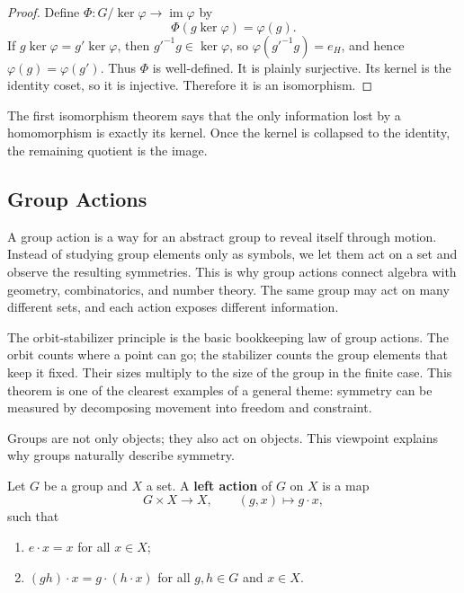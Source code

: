 \begin{proof}
Define $\Phi:G/\ker\varphi\to\operatorname{im}\varphi$ by
\[
    \Phi(g\ker\varphi)=\varphi(g).
\]
If $g\ker\varphi=g'\ker\varphi$, then $g'^{-1}g\in\ker\varphi$, so $\varphi(g'^{-1}g)=e_H$, and hence $\varphi(g)=\varphi(g')$. Thus $\Phi$ is well-defined. It is plainly surjective. Its kernel is the identity coset, so it is injective. Therefore it is an isomorphism.
\end{proof}

\begin{remark}
The first isomorphism theorem says that the only information lost by a homomorphism is exactly its kernel. Once the kernel is collapsed to the identity, the remaining quotient is the image.
\end{remark}

\subsection{Group Actions}


A group action is a way for an abstract group to reveal itself through motion. Instead of studying group elements only as symbols, we let them act on a set and observe the resulting symmetries. This is why group actions connect algebra with geometry, combinatorics, and number theory. The same group may act on many different sets, and each action exposes different information.

The orbit-stabilizer principle is the basic bookkeeping law of group actions. The orbit counts where a point can go; the stabilizer counts the group elements that keep it fixed. Their sizes multiply to the size of the group in the finite case. This theorem is one of the clearest examples of a general theme: symmetry can be measured by decomposing movement into freedom and constraint.

Groups are not only objects; they also act on objects. This viewpoint explains why groups naturally describe symmetry.

\begin{definition}
Let $G$ be a group and $X$ a set. A \textbf{left action} of $G$ on $X$ is a map
\[
    G\times X\to X,\qquad (g,x)\mapsto g\cdot x,
\]
such that
\begin{enumerate}
    \item $e\cdot x=x$ for all $x\in X$;
    \item $(gh)\cdot x=g\cdot(h\cdot x)$ for all $g,h\in G$ and $x\in X$.
\end{enumerate}
\end{definition}


